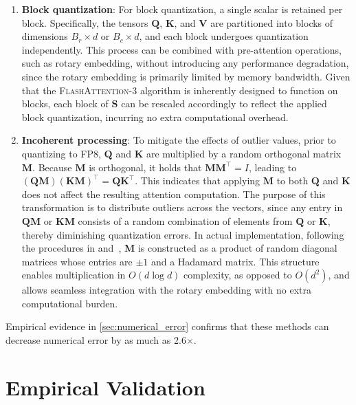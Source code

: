 \begin{enumerate}

\item \textbf{Block quantization}: For block quantization, a single scalar is retained per block. Specifically, the tensors $\mathbf{Q}$, $\mathbf{K}$, and $\mathbf{V}$ are partitioned into blocks of dimensions $B_r \times d$ or $B_c \times d$, and each block undergoes quantization independently. This process can be combined with pre-attention operations, such as rotary embedding, without introducing any performance degradation, since the rotary embedding is primarily limited by memory bandwidth. Given that the \textsc{FlashAttention-3} algorithm is inherently designed to function on blocks, each block of
$\mathbf{S}$ can be rescaled accordingly to reflect the applied block quantization, incurring no extra computational overhead.

\item \textbf{Incoherent processing}: To mitigate the effects of outlier values, prior to quantizing to FP8, $\mathbf{Q}$ and $\mathbf{K}$ are multiplied by a random orthogonal matrix $\mathbf{M}$. Because $\mathbf{M}$ is orthogonal, it holds that $\mathbf{M} \mathbf{M}^\top = I$, leading to $(\mathbf{Q} \mathbf{M}) (\mathbf{K}
\mathbf{M})^\top = \mathbf{Q} \mathbf{K}^\top$. This indicates that applying $\mathbf{M}$ to both $\mathbf{Q}$ and $\mathbf{K}$ does not affect the resulting attention computation. The purpose of this transformation is to distribute outliers across the vectors, since any entry in $\mathbf{Q} \mathbf{M}$ or $\mathbf{K} \mathbf{M}$ consists of a random combination of elements from $\mathbf{Q}$ or $\mathbf{K}$, thereby diminishing quantization errors. In actual implementation, following the procedures in \citet{chee2024quip} and~\citet{tseng2024quip}, $\mathbf{M}$ is constructed as a product of random diagonal matrices whose entries are $\pm 1$ and a Hadamard matrix. This structure enables multiplication in $O(d \log d)$ complexity, as opposed to $O(d^2)$, and allows seamless integration with the rotary embedding with no extra computational burden.
\end{enumerate}

Empirical evidence in \cref{sec:numerical_error} confirms that these methods can decrease numerical error by as much as 2.6$\times$.

\section{Empirical Validation}
\label{sec:exp}

